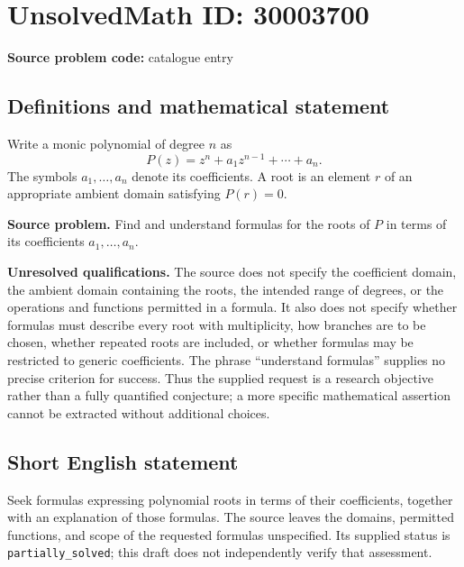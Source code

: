 \documentclass[11pt]{article}
\begin{document}
\section*{UnsolvedMath ID: 30003700}
\textbf{Source problem code:} catalogue entry
\subsection{Definitions and mathematical statement}
Write a monic polynomial of degree \(n\) as
\[
P(z)=z^n+a_1z^{n-1}+\cdots+a_n.
\]
The symbols \(a_1,\ldots,a_n\) denote its coefficients. A root is an element \(r\) of an appropriate ambient domain satisfying \(P(r)=0\).

\textbf{Source problem.} Find and understand formulas for the roots of \(P\) in terms of its coefficients \(a_1,\ldots,a_n\).

\textbf{Unresolved qualifications.} The source does not specify the coefficient domain, the ambient domain containing the roots, the intended range of degrees, or the operations and functions permitted in a formula. It also does not specify whether formulas must describe every root with multiplicity, how branches are to be chosen, whether repeated roots are included, or whether formulas may be restricted to generic coefficients. The phrase ``understand formulas'' supplies no precise criterion for success. Thus the supplied request is a research objective rather than a fully quantified conjecture; a more specific mathematical assertion cannot be extracted without additional choices.
\subsection{Short English statement}
Seek formulas expressing polynomial roots in terms of their coefficients, together with an explanation of those formulas. The source leaves the domains, permitted functions, and scope of the requested formulas unspecified. Its supplied status is \texttt{partially\_solved}; this draft does not independently verify that assessment.
\end{document}
